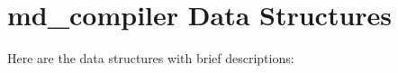 \section{md\_\-compiler Data Structures}
Here are the data structures with brief descriptions:\begin{CompactList}
\item{}
\end{CompactList}
